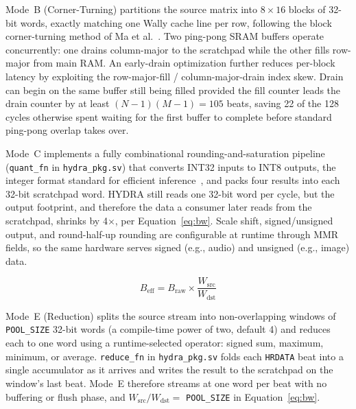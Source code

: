 \documentclass[conference]{IEEEtran}
\begin{document}
        Mode~B (Corner-Turning) partitions the source matrix into $8 \times 16$ 
        blocks of 32-bit words, exactly matching one Wally cache line per row, following the block corner-turning method of Ma et al.~\cite{ma2019}. 
        Two ping-pong SRAM buffers operate concurrently: one drains column-major 
        to the scratchpad while the other fills row-major from main RAM. An 
        early-drain optimization further reduces per-block latency by exploiting 
        the row-major-fill / column-major-drain index skew. Drain can begin on 
        the same buffer still being filled provided the fill counter leads the 
        drain counter by at least $(N-1)(M-1) = 105$ beats, saving 22 of the 
        128 cycles otherwise spent waiting for the first buffer to complete 
        before standard ping-pong overlap takes over.
        
        Mode~C implements a fully combinational rounding-and-saturation
        pipeline (\texttt{quant\_fn} in \texttt{hydra\_pkg.sv}) that converts
        INT32 inputs to INT8 outputs, the integer format standard for
        efficient inference~\cite{jacob2018}, and packs four results into
        each 32-bit scratchpad word. HYDRA still reads one 32-bit word per
        cycle, but the output footprint, and therefore the data a consumer
        later reads from the scratchpad, shrinks by 4$\times$, per
        Equation~\ref{eq:bw}. Scale shift, signed/unsigned output, and
        round-half-up rounding are configurable at runtime through MMR
        fields, so the same hardware serves signed (e.g., audio) and
        unsigned (e.g., image) data.
        
        \begin{equation}
        B_{\text{eff}} = B_{\text{raw}} \times \frac{W_{\text{src}}}{W_{\text{dst}}}
        \label{eq:bw}
        \end{equation}

        Mode~E (Reduction) splits the source stream into non-overlapping
        windows of \texttt{POOL\_SIZE} 32-bit words (a compile-time power of
        two, default 4) and reduces each to one word using a runtime-selected
        operator: signed sum, maximum, minimum, or average. \texttt{reduce\_fn}
        in \texttt{hydra\_pkg.sv} folds each \texttt{HRDATA} beat into a single
        accumulator as it arrives and writes the result to the scratchpad on
        the window's last beat. Mode~E therefore streams at one word per beat
        with no buffering or flush phase, and
        $W_{\text{src}}/W_{\text{dst}} = $ \texttt{POOL\_SIZE} in
        Equation~\ref{eq:bw}.
\end{document}
